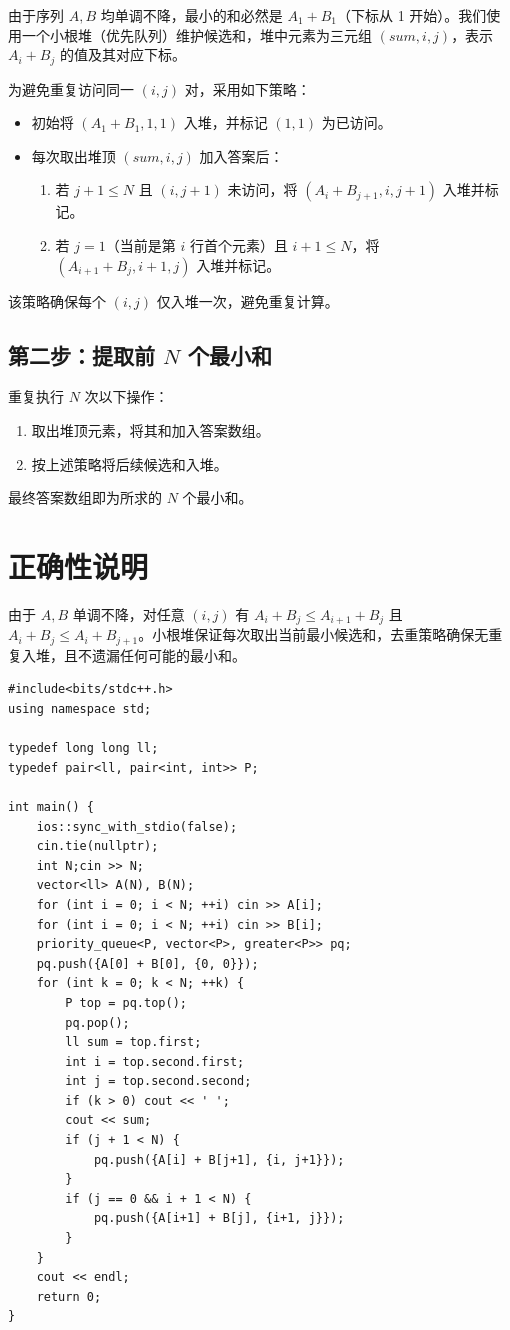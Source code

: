 \documentclass[11pt,a4paper,twocolumn]{ctexart}  %
\begin{document}
由于序列 $A, B$ 均单调不降，最小的和必然是 $A_1 + B_1$（下标从 1 开始）。我们使用一个小根堆（优先队列）维护候选和，堆中元素为三元组 $(sum, i, j)$，表示 $A_i + B_j$ 的值及其对应下标。

为避免重复访问同一 $(i, j)$ 对，采用如下策略：
\begin{itemize}
    \item 初始将 $(A_1 + B_1, 1, 1)$ 入堆，并标记 $(1, 1)$ 为已访问。
    \item 每次取出堆顶 $(sum, i, j)$ 加入答案后：
    \begin{enumerate}
        \item 若 $j + 1 \leq N$ 且 $(i, j+1)$ 未访问，将 $(A_i + B_{j+1}, i, j+1)$ 入堆并标记。
        \item 若 $j = 1$（当前是第 $i$ 行首个元素）且 $i + 1 \leq N$，将 $(A_{i+1} + B_j, i+1, j)$ 入堆并标记。
    \end{enumerate}
\end{itemize}

该策略确保每个 $(i, j)$ 仅入堆一次，避免重复计算。

\subsection*{第二步：提取前 $N$ 个最小和}

重复执行 $N$ 次以下操作：
\begin{enumerate}
    \item 取出堆顶元素，将其和加入答案数组。
    \item 按上述策略将后续候选和入堆。
\end{enumerate}

最终答案数组即为所求的 $N$ 个最小和。

\section*{正确性说明}

由于 $A, B$ 单调不降，对任意 $(i, j)$ 有 $A_i + B_j \leq A_{i+1} + B_j$ 且 $A_i + B_j \leq A_i + B_{j+1}$。小根堆保证每次取出当前最小候选和，去重策略确保无重复入堆，且不遗漏任何可能的最小和。


\begin{lstlisting}[caption={堆}]
#include<bits/stdc++.h>
using namespace std;

typedef long long ll;
typedef pair<ll, pair<int, int>> P;

int main() {
    ios::sync_with_stdio(false);
    cin.tie(nullptr);
    int N;cin >> N;
    vector<ll> A(N), B(N);
    for (int i = 0; i < N; ++i) cin >> A[i];
    for (int i = 0; i < N; ++i) cin >> B[i];
    priority_queue<P, vector<P>, greater<P>> pq;
    pq.push({A[0] + B[0], {0, 0}});
    for (int k = 0; k < N; ++k) {
        P top = pq.top();
        pq.pop();
        ll sum = top.first;
        int i = top.second.first;
        int j = top.second.second;
        if (k > 0) cout << ' ';
        cout << sum;
        if (j + 1 < N) {
            pq.push({A[i] + B[j+1], {i, j+1}});
        }
        if (j == 0 && i + 1 < N) {
            pq.push({A[i+1] + B[j], {i+1, j}});
        }
    }
    cout << endl;
    return 0;
}
\end{lstlisting}
\end{document}
